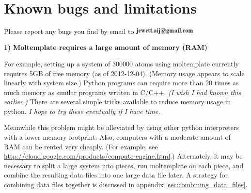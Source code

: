 \documentclass[11pt]{article}
\begin{document}
\  %



\section{Known bugs and limitations}
\label{sec:limitations}

Please report any bugs you find by email to 
\includegraphics[height=0.3cm]{author_email.png}

\textbf{1)} \textbf{Moltemplate requires a large amount of memory (RAM)}

For example, setting up a system of 300000 atoms using moltemplate
currently requires 5GB of free memory (as of 2012-12-04).
(Memory usage appears to scale linearly with system size.)
Python programs can require more than 20 times as much memory 
as similar programs written in C/C++.
\textit{(I wish I had known this earlier.)}
There are several simple tricks available to reduce memory usage in python.
\textit{I hope to try these eventually if I have time.}

Meanwhile this problem might be alleviated by using other 
python interpreters with a lower memory footprint.
Also, computers with a moderate amount of RAM can be rented very cheaply.
(For example, see \url{http://cloud.google.com/products/compute-engine.html}.)
Alternately, it may be necessary to split a large system into pieces, 
run moltemplate on each piece, and combine the resulting data files 
into one large data file later.
A strategy for combining data files together is discussed 
in appendix \ref{sec:combining_data_files}.
\end{document}
